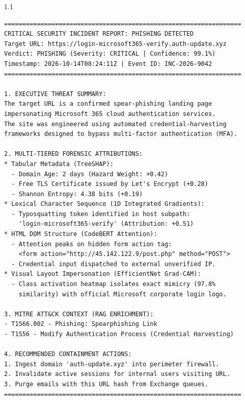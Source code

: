 \begin{spacing}{1.1}
\begin{lstlisting}[basicstyle=\footnotesize\ttfamily, breaklines=true, frame=single]
=================================================================
CRITICAL SECURITY INCIDENT REPORT: PHISHING DETECTED
Target URL: https://login-microsoft365-verify.auth-update.xyz
Verdict: PHISHING (Severity: CRITICAL | Confidence: 99.1%)
Timestamp: 2026-10-14T08:24:11Z | Event ID: INC-2026-9042
=================================================================

1. EXECUTIVE THREAT SUMMARY:
The target URL is a confirmed spear-phishing landing page 
impersonating Microsoft 365 cloud authentication services. 
The site was engineered using automated credential-harvesting 
frameworks designed to bypass multi-factor authentication (MFA).

2. MULTI-TIERED FORENSIC ATTRIBUTIONS:
* Tabular Metadata (TreeSHAP):
  - Domain Age: 2 days (Hazard Weight: +0.42)
  - Free TLS Certificate issued by Let's Encrypt (+0.28)
  - Shannon Entropy: 4.38 bits (+0.19)
* Lexical Character Sequence (1D Integrated Gradients):
  - Typosquatting token identified in host subpath:
    'login-microsoft365-verify' (Attribution: +0.51)
* HTML DOM Structure (CodeBERT Attention):
  - Attention peaks on hidden form action tag:
    <form action="http://45.142.122.9/post.php" method="POST">
  - Credential input dispatched to external unverified IP.
* Visual Layout Impersonation (EfficientNet Grad-CAM):
  - Class activation heatmap isolates exact mimicry (97.8% 
    similarity) with official Microsoft corporate login logo.

3. MITRE ATT&CK CONTEXT (RAG ENRICHMENT):
- T1566.002 - Phishing: Spearphishing Link
- T1556 - Modify Authentication Process (Credential Harvesting)

4. RECOMMENDED CONTAINMENT ACTIONS:
1. Ingest domain 'auth-update.xyz' into perimeter firewall.
2. Invalidate active sessions for internal users visiting URL.
3. Purge emails with this URL hash from Exchange queues.
=================================================================
\end{lstlisting}
\end{spacing}
